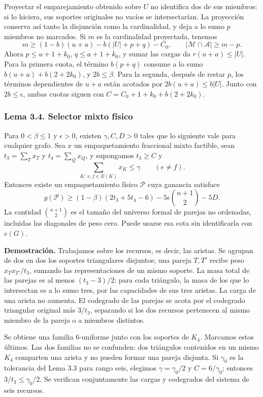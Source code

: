 \documentclass[spanish,11pt,a4paper]{article}
\begin{document}
Proyectar el emparejamiento obtenido sobre \(U\) no identifica dos de sus miembros: si lo hiciera, sus soportes originales no vacíos se intersectarían. La proyección conserva así tanto la disjunción como la cardinalidad, y deja a lo sumo \(p\) miembros no marcados. Si \(m\) es la cardinalidad proyectada, tenemos \[
m\ge(1-b)(u+a)-b(|U|+p+q)-C_0,
\qquad |\mathcal M\cap\mathcal A|\ge m-p.
\] Ahora \(p\le u+1+k_0\), \(q\le a+1+k_0\), y sumar las cargas da \(r(u+a)\le|U|\). Para la primera cuota, el término \(b(p+q)\) consume a lo sumo \(b(u+a)+b(2+2k_0)\), y \(2b\le\beta\). Para la segunda, después de restar \(p\), los términos dependientes de \(u+a\) están acotados por \(2b(u+a)\le b|U|\). Junto con \(2b\le\epsilon\), ambas cuotas siguen con \(C=C_0+1+k_0+b(2+2k_0)\).

\subsubsection{Lema 3.4. Selector mixto físico}\label{lema-3.4.-selector-mixto-fuxedsico}

Para \(0<\beta\le1\) y \(\epsilon>0\), existen \(\gamma,C,D>0\) tales que lo siguiente vale para cualquier grafo. Sea \(x\) un empaquetamiento fraccional mixto factible, sean \(t_3=\sum_Tx_T\) y \(t_4=\sum_Qx_Q\), y supongamos \(t_3\ge C\) y \[
\sum_{K:\ e,f\in E(K)}x_K\le\gamma\qquad(e\ne f).
\tag{3.5}
\] Entonces existe un empaquetamiento físico \(\mathcal P\) cuya ganancia satisface \[
g(\mathcal P)\ge(1-\beta)(2t_3+5t_4-6)
 -5\epsilon\binom{n+1}{2}-5D.
\tag{3.6}
\] La cantidad \(\binom{n+1}{2}\) es el tamaño del universo formal de parejas no ordenadas, incluidas las diagonales de peso cero. Puede usarse esa cota sin identificarla con \(e(G)\).

\textbf{Demostración.} Trabajamos sobre los recursos, es decir, las aristas. Se agrupan de dos en dos los soportes triangulares disjuntos; una pareja \(T,T'\) recibe peso \(x_Tx_{T'}/t_3\), sumando las representaciones de un mismo soporte. La masa total de las parejas es al menos \((t_3-3)/2\): para cada triángulo, la masa de los que lo intersectan es a lo sumo tres, por las capacidades de sus tres aristas. La carga de una arista no aumenta. El codegrado de las parejas se acota por el codegrado triangular original más \(3/t_3\), separando si los dos recursos pertenecen al mismo miembro de la pareja o a miembros distintos.

Se obtiene una familia 6-uniforme junto con los soportes de \(K_4\). Marcamos estos últimos. Las dos familias no se confunden: dos triángulos contenidos en un mismo \(K_4\) comparten una arista y no pueden formar una pareja disjunta. Si \(\gamma_0\) es la tolerancia del Lema 3.3 para rango seis, elegimos \(\gamma=\gamma_0/2\) y \(C=6/\gamma_0\); entonces \(3/t_3\le\gamma_0/2\). Se verifican conjuntamente las cargas y codegrados del sistema de seis recursos.
\end{document}
